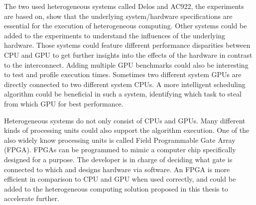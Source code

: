 The two used heterogeneous systems called Delos and AC922, the experiments are based on, show that the underlying system/hardware specifications are essential for the execution of heterogeneous computing. Other systems could be added to the experiments to understand the influences of the underlying hardware. Those systems could feature different performance disparities between CPU and GPU to get further insights into the effects of the hardware in contrast to the interconnect. Adding multiple GPU benchmarks could also be interesting to test and profile execution times. Sometimes two different system GPUs are directly connected to two different system CPUs. A more intelligent scheduling algorithm could be beneficial in such a system, identifying which task to steal from which GPU for best performance.

Heterogeneous systems do not only consist of CPUs and GPUs. Many different kinds of processing units could also support the algorithm execution. One of the also widely know processing units is called Field Programmable Gate Array (FPGA). FPGAs can be programmed to mimic a computer chip specifically designed for a purpose. The developer is in charge of deciding what gate is connected to which and designs hardware via software. An FPGA is more efficient in comparison to CPU and GPU when used correctly, \cite{qasaimehComparingEnergyEfficiency2019} and could be added to the heterogeneous computing solution proposed in this thesis to accelerate further.
% 